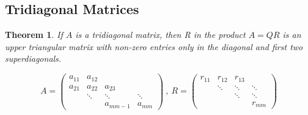 \documentclass{article}
\numberwithin{pic}{section}
\numberwithin{lem}{section}
\newtheorem{thm}{Theorem}
\numberwithin{thm}{section}
\numberwithin{cor}{section}
\theoremstyle{definition}
\numberwithin{ex}{section}
\numberwithin{defn}{section}
\theoremstyle{definition}
\theoremstyle{remark}
\begin{document}
\subsection{Tridiagonal Matrices}
\begin{thm}
If $A$ is a tridiagonal matrix, then R in the product $A=QR$ is an upper triangular matrix with non-zero entries only in the diagonal and first two superdiagonals.
\end{thm}
\[A=\begin{pmatrix}
a_{11} & a_{12} &  &   \\ 
a_{21} & a_{22} & a_{23} &    \\ 
 & \ddots & \ddots & \ddots   \\ 
   &  & a_{m m-1} & a_{mm}
\end{pmatrix}~,~R=\begin{pmatrix}
r_{11} & r_{12} & r_{13} &  \\ 
 & \ddots & \ddots & \ddots \\ 
 &  & \ddots & \ddots \\ 
 &  &  & r_{mm}
\end{pmatrix}  \]
\end{document}
